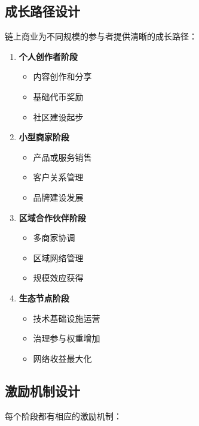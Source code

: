 \documentclass[
  Letterpaper,
]{scrbook}
\providecommand{\tightlist}{%
  \setlength{\itemsep}{0pt}\setlength{\parskip}{0pt}}
\begin{document}
\subsection{成长路径设计}\label{ux6210ux957fux8defux5f84ux8bbeux8ba1}

链上商业为不同规模的参与者提供清晰的成长路径：

\begin{enumerate}
\def\labelenumi{\arabic{enumi}.}
\tightlist
\item
  \textbf{个人创作者阶段}

  \begin{itemize}
  \tightlist
  \item
    内容创作和分享
  \item
    基础代币奖励
  \item
    社区建设起步
  \end{itemize}
\item
  \textbf{小型商家阶段}

  \begin{itemize}
  \tightlist
  \item
    产品或服务销售
  \item
    客户关系管理
  \item
    品牌建设发展
  \end{itemize}
\item
  \textbf{区域合作伙伴阶段}

  \begin{itemize}
  \tightlist
  \item
    多商家协调
  \item
    区域网络管理
  \item
    规模效应获得
  \end{itemize}
\item
  \textbf{生态节点阶段}

  \begin{itemize}
  \tightlist
  \item
    技术基础设施运营
  \item
    治理参与权重增加
  \item
    网络收益最大化
  \end{itemize}
\end{enumerate}

\subsection{激励机制设计}\label{ux6fc0ux52b1ux673aux5236ux8bbeux8ba1}

每个阶段都有相应的激励机制：
\end{document}
